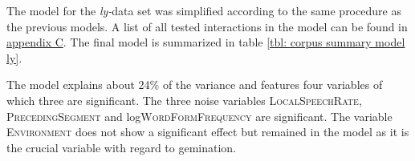 The model for the \textit{ly-}data set was simplified according to the same procedure as the  previous models. A list of all tested interactions in the model can be found in \hyperref[Appendix C: Summaries of tested interactions in corpus study]{appendix C}. 
The final model is summarized in table \ref {tbl: corpus summary model ly}.


\begin{table}[h!]
	\caption{Summary of linear model for variables predicting the  duration of [l] in -suffixed words}
	\label{tbl: corpus summary model ly}
	\begin{center}
	\end{center}
\end{table}





The model explains about 24\% of the variance and features four variables of which three are significant. The three noise variables \textsc{LocalSpeechRate}, \textsc{PrecedingSegment} and log\textsc{WordFormFrequency} are significant. 
The variable \textsc{Environment} does not show a significant effect but remained in the model as it is the crucial variable with regard to gemination.

